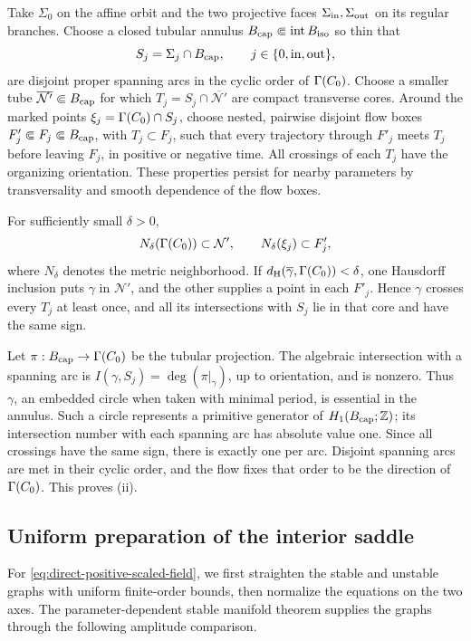 Take \(\Sigma_0\) on the affine orbit and the two projective faces
\(\Sigma_{\rm in},\Sigma_{\rm out}\) on its regular branches.
Choose a closed tubular annulus
\(B_{\rm cap}\Subset\operatorname{int}B_{\rm iso}\) so thin that
\[
 S_j=\Sigma_j\cap B_{\rm cap},\qquad
 j\in\{0,\mathrm{in},\mathrm{out}\},
\]
are disjoint proper spanning arcs in the cyclic order of \(\Gamma(C_0)\).
Choose a smaller tube
\(\overline{\mathcal N'}\Subset B_{\rm cap}\) for which
\(T_j=S_j\cap\overline{\mathcal N'}\) are compact transverse cores.
Around the marked points \(\xi_j=\Gamma(C_0)\cap S_j\), choose nested,
pairwise disjoint flow boxes \(F'_j\Subset F_j\Subset B_{\rm cap}\),
with \(T_j\subset F_j\), such that every trajectory through \(F'_j\)
meets \(T_j\) before leaving \(F_j\), in positive or negative time.
All crossings of each \(T_j\) have the organizing orientation.
These properties persist for nearby parameters by transversality
and smooth dependence of the flow boxes.

For sufficiently small \(\delta>0\),
\[
 N_\delta(\Gamma(C_0))\subset\mathcal N',\qquad
 N_\delta(\xi_j)\subset F'_j,
\]
where \(N_\delta\) denotes the metric neighborhood. If
\(d_{\mathrm H}(\overline\gamma,\Gamma(C_0))<\delta\), one Hausdorff inclusion
puts \(\gamma\) in \(\mathcal N'\), and the other supplies a point in
each \(F'_j\). Hence \(\gamma\) crosses every \(T_j\) at least once,
and all its intersections with \(S_j\) lie in that core and have the
same sign.

Let \(\pi:B_{\rm cap}\to\Gamma(C_0)\) be the tubular projection.
The algebraic intersection with a spanning arc is
\(I(\gamma,S_j)=\deg(\pi|_\gamma)\), up to orientation, and is nonzero.
Thus \(\gamma\), an embedded circle when taken with minimal period,
is essential in the annulus. Such a circle represents a primitive
generator of \(H_1(B_{\rm cap};\mathbb Z)\); its intersection number
with each spanning arc has absolute value one. Since all crossings
have the same sign, there is exactly one per arc. Disjoint spanning
arcs are met in their cyclic order, and the flow fixes that order to
be the direction of \(\Gamma(C_0)\). This proves (ii).

\subsection{Uniform preparation of the interior saddle}
\label{app:positive-saddle-preparation}

For \eqref{eq:direct-positive-scaled-field}, we first straighten the
stable and unstable graphs with uniform finite-order bounds, then
normalize the equations on the two axes. The parameter-dependent
stable manifold theorem \cite[Theorem~9.6]{Teschl2012} supplies the
graphs through the following amplitude comparison.

